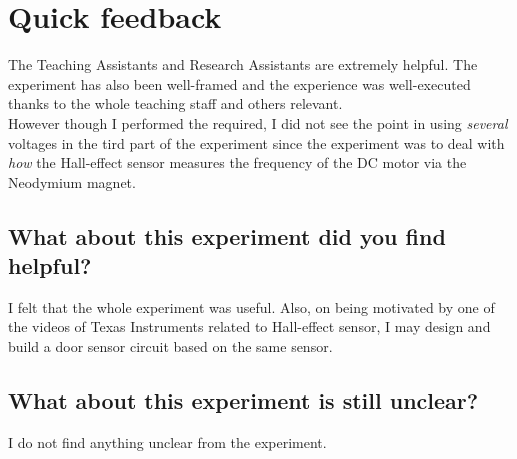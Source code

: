 \documentclass[12pt]{article}
\begin{document}
\section{Quick feedback}

The Teaching Assistants and Research Assistants are extremely helpful. The experiment has also been well-framed and the experience was well-executed thanks to the whole teaching staff and others relevant.\\
However though I performed the required, I did not see the point in using \textit{several} voltages in the tird part of the experiment since the experiment was to deal with \textit{how} the Hall-effect sensor measures the frequency of the DC motor via the Neodymium magnet.

\subsection{What about this experiment did you find helpful?}
I felt that the whole experiment was useful. Also, on being motivated by one of the videos of Texas Instruments related to Hall-effect sensor, I may design and build a door sensor circuit based on the same sensor.
\subsection{What about this experiment is still unclear?}
I do not find anything unclear from the experiment.
\end{document}
